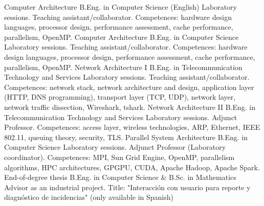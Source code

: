 \documentclass[]{friggeri-cv}
\begin{document}
\begin{entrylist}
{}
{Computer Architecture}
{B.Eng. in Computer Science (English)}
{Laboratory sessions. Teaching assistant/collaborator. Competences: hardware design languages, processor design, performance assessment, cache performance, parallelism, OpenMP. %
}
{Computer Architecture}
{B.Eng. in Computer Science}
{Laboratory sessions. Teaching assistant/collaborator. Competences: hardware design languages, processor design, performance assessment, cache performance, parallelism, OpenMP. %
}
{Network Architecture I}
{B.Eng. in Telecommunication Technology and Services}
{Laboratory sessions. Teaching assistant/collaborator. Competences: network stack, network architecture and design, application layer (HTTP, DNS programming), transport layer (TCP, UDP), network layer, network traffic dissection, Wireshark, tshark. %
}
{Network Architecture II}
{B.Eng. in Telecommunication Technology and Services}
{Laboratory sessions. Adjunct Professor. Competences: access layer, wireless technologies, ARP, Ethernet, IEEE 802.11, queuing theory, security, TLS. %
}
{Parallel System Architecture}
{B.Eng. in Computer Science}
{Laboratory sessions. Adjunct Professor (Laboratory coordinator). Competences: MPI, Sun Grid Engine, OpenMP, parallelism algorithms, HPC architectures, GPGPU, CUDA, Apache Hadoop, Apache Spark. %
}
{End-of-degree thesis}
{B.Eng. in Computer Science \& B.Sc. in Mathematics}
{Advisor as an industrial project. Title: "Interacción con usuario para reporte y diagnóstico de incidencias" (only available in Spanish)
}
\end{entrylist}
\end{document}
